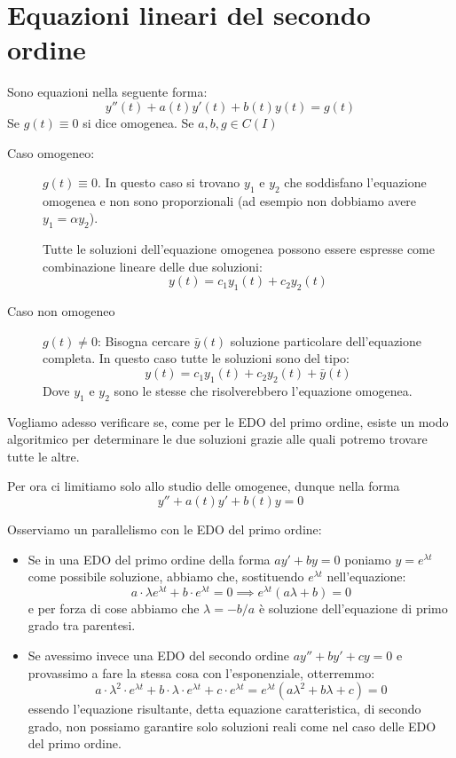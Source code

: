 \documentclass[12pt]{report}
\begin{document}
	\newpage
	\section{Equazioni lineari del secondo ordine}
	Sono equazioni nella seguente forma:
	\[
	y''(t) + a(t)y'(t) + b(t)y(t) = g(t)
	\]
	Se $g(t) \equiv 0$ si dice omogenea.
	Se $a, b, g \in C(I)$
	
	\begin{description}
		
		\item [Caso omogeneo:] $g(t) \equiv 0$. In questo caso si trovano $y_1$ e $y_2$ che soddisfano l'equazione omogenea e non sono proporzionali (ad esempio non dobbiamo avere $y_1 = \alpha y_2$).
		
		Tutte le soluzioni dell'equazione omogenea possono essere espresse come combinazione lineare delle due soluzioni:
		\[
		y(t) = c_1 y_1(t) + c_2 y_2(t)
		\]
		
		\item[Caso non omogeneo] $g(t) \neq 0$: Bisogna cercare $\bar{y}(t)$ soluzione particolare dell'equazione completa.
		In questo caso tutte le soluzioni sono del tipo:
		\[
		y(t) = c_1 y_1(t) + c_2 y_2(t) + \bar{y}(t)
		\]
		Dove $y_1$ e $y_2$ sono le stesse che risolverebbero l'equazione omogenea.
		
	\end{description}
	
	Vogliamo adesso verificare se, come per le EDO del primo ordine, esiste un modo algoritmico per determinare le due soluzioni grazie alle quali potremo trovare tutte le altre.
	
	Per ora ci limitiamo solo allo studio delle omogenee, dunque nella forma
	\[
	y'' + a(t)y' + b(t)y = 0
	\]
	
	Osserviamo un parallelismo con le EDO del primo ordine:
	\begin{itemize}
		
		\item Se in una EDO del primo ordine della forma $ay' + by = 0$ poniamo $y = e^{\lambda t}$ come possibile soluzione, abbiamo che, sostituendo $e^{\lambda t}$ nell'equazione:
		\[
		a \cdot \lambda e^{\lambda t} + b \cdot e^{\lambda t} = 0 \implies e^{\lambda t}(a\lambda + b) = 0
		\]
		e per forza di cose abbiamo che $\lambda = -b/a$ è soluzione dell'equazione di primo grado tra parentesi.
		
		\item Se avessimo invece una EDO del secondo ordine $ay'' + by' + cy = 0$ e provassimo a fare la stessa cosa con l'esponenziale, otterremmo:
		\[
		a \cdot \lambda^2 \cdot e^{\lambda t} + b \cdot \lambda \cdot e^{\lambda t} + c \cdot e^{\lambda t} = e^{\lambda t}(a\lambda^2 + b\lambda + c) = 0
		\]
		essendo l'equazione risultante, detta equazione caratteristica, di secondo grado, non possiamo garantire solo soluzioni reali come nel caso delle EDO del primo ordine.
		
	\end{itemize}
	
\end{document}
